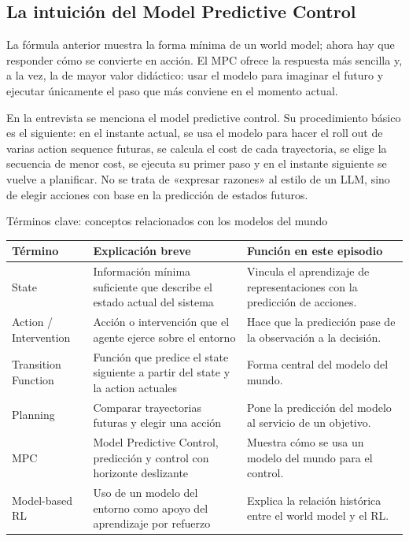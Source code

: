 \subsection{La intuición del Model Predictive Control}

La fórmula anterior muestra la forma mínima de un world model; ahora hay que responder cómo se convierte en acción. El MPC ofrece la respuesta más sencilla y, a la vez, la de mayor valor didáctico: usar el modelo para imaginar el futuro y ejecutar únicamente el paso que más conviene en el momento actual.

En la entrevista se menciona el model predictive control. Su procedimiento básico es el siguiente: en el instante actual, se usa el modelo para hacer el roll out de varias action sequence futuras, se calcula el cost de cada trayectoria, se elige la secuencia de menor cost, se ejecuta su primer paso y en el instante siguiente se vuelve a planificar. No se trata de «expresar razones» al estilo de un LLM, sino de elegir acciones con base en la predicción de estados futuros.

\begin{knowledgebox}{Términos clave: conceptos relacionados con los modelos del mundo}
\begin{tabularx}{\textwidth}{p{}p{}X}
\toprule
Término & Explicación breve & Función en este episodio \\
\midrule
State & Información mínima suficiente que describe el estado actual del sistema & Vincula el aprendizaje de representaciones con la predicción de acciones. \\
Action / Intervention & Acción o intervención que el agente ejerce sobre el entorno & Hace que la predicción pase de la observación a la decisión. \\
Transition Function & Función que predice el state siguiente a partir del state y la action actuales & Forma central del modelo del mundo. \\
Planning & Comparar trayectorias futuras y elegir una acción & Pone la predicción del modelo al servicio de un objetivo. \\
MPC & Model Predictive Control, predicción y control con horizonte deslizante & Muestra cómo se usa un modelo del mundo para el control. \\
Model-based RL & Uso de un modelo del entorno como apoyo del aprendizaje por refuerzo & Explica la relación histórica entre el world model y el RL. \\
\bottomrule
\end{tabularx}
\end{knowledgebox}

